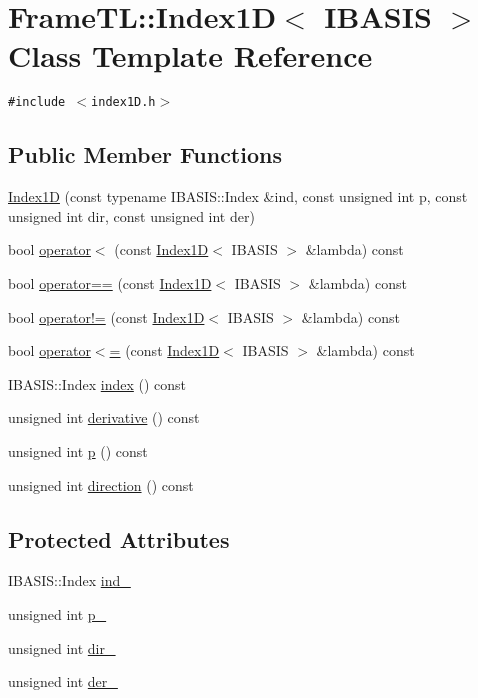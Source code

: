 \hypertarget{classFrameTL_1_1Index1D}{
\section{FrameTL::Index1D$<$ IBASIS $>$ Class Template Reference}
\label{classFrameTL_1_1Index1D}
}
{\tt \#include $<$index1D.h$>$}

\subsection*{Public Member Functions}
\begin{CompactItemize}
\item 
\hyperlink{classFrameTL_1_1Index1D_009f4a2f3382426f8c0560c7e764e7a8}{Index1D} (const typename IBASIS::Index \&ind, const unsigned int p, const unsigned int dir, const unsigned int der)
\item 
bool \hyperlink{classFrameTL_1_1Index1D_276b4f8c960e7bce5cac8d63c5c07bad}{operator$<$} (const \hyperlink{classFrameTL_1_1Index1D}{Index1D}$<$ IBASIS $>$ \&lambda) const 
\item 
bool \hyperlink{classFrameTL_1_1Index1D_ae4f859de8325a33501146ddc6794473}{operator==} (const \hyperlink{classFrameTL_1_1Index1D}{Index1D}$<$ IBASIS $>$ \&lambda) const 
\item 
bool \hyperlink{classFrameTL_1_1Index1D_a966fed809d2871b7cec4eadeffb6814}{operator!=} (const \hyperlink{classFrameTL_1_1Index1D}{Index1D}$<$ IBASIS $>$ \&lambda) const 
\item 
bool \hyperlink{classFrameTL_1_1Index1D_3509b3f4c7673c40da1485b3b4b77274}{operator$<$=} (const \hyperlink{classFrameTL_1_1Index1D}{Index1D}$<$ IBASIS $>$ \&lambda) const 
\item 
IBASIS::Index \hyperlink{classFrameTL_1_1Index1D_c7730cfbad3d3f89e1a22f7f6b8ee6b9}{index} () const 
\item 
unsigned int \hyperlink{classFrameTL_1_1Index1D_46d0d42aec593b2e95c9b5c9d52c8996}{derivative} () const 
\item 
unsigned int \hyperlink{classFrameTL_1_1Index1D_81891e5fbcc38d52ac67b79f31fbe4e9}{p} () const 
\item 
unsigned int \hyperlink{classFrameTL_1_1Index1D_6b15c805cffc08a4c241b6343573fe0a}{direction} () const 
\end{CompactItemize}
\subsection*{Protected Attributes}
\begin{CompactItemize}
\item 
IBASIS::Index \hyperlink{classFrameTL_1_1Index1D_b6de25bfbba40ba29cb649ee96c8e3dd}{ind\_\-}
\item 
unsigned int \hyperlink{classFrameTL_1_1Index1D_76b815344076e70d88f55782813d380e}{p\_\-}
\item 
unsigned int \hyperlink{classFrameTL_1_1Index1D_6415d2263117ba0f0b88acfb6b25558b}{dir\_\-}
\item 
unsigned int \hyperlink{classFrameTL_1_1Index1D_edcb84781a4ebd4dde1a85197fd270f6}{der\_\-}
\end{CompactItemize}


